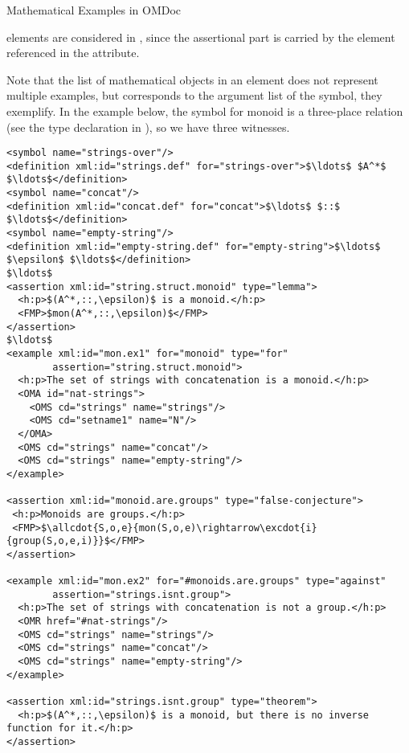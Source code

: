 \begin{omgroup}[short=Mathematical Statements,id=statements]
\begin{omgroup}[id=examples]{Mathematical Examples in OMDoc}
\begin{module}[id=examples]
 elements are considered
 in \omdoc, since the assertional part is
carried by the  element referenced in the
 attribute.

Note that the list of mathematical objects in an  element does not
represent multiple examples, but corresponds to the argument list of the symbol, they
exemplify. In the example below, the symbol for monoid is a three-place relation (see the
type declaration in {}), so we have three witnesses.

\begin{lstlisting}[label=lst:example,mathescape,
  caption={An \omdoc representation of a mathematical example},
  index={example,for,type,assertion}]
<symbol name="strings-over"/>
<definition xml:id="strings.def" for="strings-over">$\ldots$ $A^*$ $\ldots$</definition>
<symbol name="concat"/>
<definition xml:id="concat.def" for="concat">$\ldots$ $::$ $\ldots$</definition>
<symbol name="empty-string"/>
<definition xml:id="empty-string.def" for="empty-string">$\ldots$ $\epsilon$ $\ldots$</definition>
$\ldots$
<assertion xml:id="string.struct.monoid" type="lemma">
  <h:p>$(A^*,::,\epsilon)$ is a monoid.</h:p>
  <FMP>$mon(A^*,::,\epsilon)$</FMP>
</assertion>
$\ldots$
<example xml:id="mon.ex1" for="monoid" type="for"
        assertion="string.struct.monoid">
  <h:p>The set of strings with concatenation is a monoid.</h:p>
  <OMA id="nat-strings">
    <OMS cd="strings" name="strings"/>
    <OMS cd="setname1" name="N"/>
  </OMA>
  <OMS cd="strings" name="concat"/>
  <OMS cd="strings" name="empty-string"/>
</example>

<assertion xml:id="monoid.are.groups" type="false-conjecture">
 <h:p>Monoids are groups.</h:p>
 <FMP>$\allcdot{S,o,e}{mon(S,o,e)\rightarrow\excdot{i}{group(S,o,e,i)}}$</FMP>
</assertion>

<example xml:id="mon.ex2" for="#monoids.are.groups" type="against"
        assertion="strings.isnt.group">
  <h:p>The set of strings with concatenation is not a group.</h:p>
  <OMR href="#nat-strings"/>
  <OMS cd="strings" name="strings"/>
  <OMS cd="strings" name="concat"/>
  <OMS cd="strings" name="empty-string"/>
</example>

<assertion xml:id="strings.isnt.group" type="theorem">
  <h:p>$(A^*,::,\epsilon)$ is a monoid, but there is no inverse function for it.</h:p>
</assertion>
\end{lstlisting}


\end{module}
\end{omgroup}
\end{omgroup}
